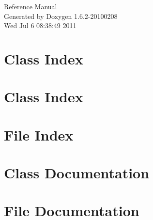 \documentclass[a4paper]{book}
\begin{document}
\hypersetup{pageanchor=false}
\begin{titlepage}
\vspace*{7cm}
\begin{center}
{\Large Reference Manual}\\
\vspace*{1cm}
{\large Generated by Doxygen 1.6.2-20100208}\\
\vspace*{0.5cm}
{\small Wed Jul 6 08:38:49 2011}\\
\end{center}
\end{titlepage}
\clearemptydoublepage
{}
\tableofcontents
\clearemptydoublepage
{}
\hypersetup{pageanchor=true}
\chapter{Class Index}

\chapter{Class Index}

\chapter{File Index}

\chapter{Class Documentation}
























\chapter{File Documentation}




















\printindex
\end{document}

